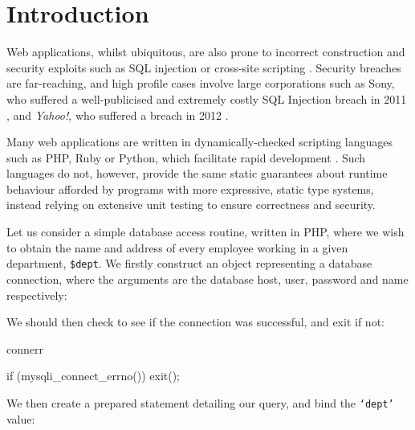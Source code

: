 \section{Introduction}

Web applications, whilst ubiquitous, are also prone to incorrect construction
and security exploits such as SQL injection \cite{owasp:sqli} or cross-site
scripting \cite{owasp:xss}. Security breaches are
far-reaching, and high profile cases involve large corporations such as Sony,
who suffered a well-publicised and extremely costly SQL Injection breach in
2011 \cite{ieee:sony}, and \textit{Yahoo!}, who suffered a breach in 2012
\cite{imperva:yahoo}. 

Many web applications are written in dynamically-checked scripting languages
such as PHP, Ruby or Python, which facilitate rapid development
\cite{w3techs:webpls}. Such languages do not, however, provide the same static 
guarantees about runtime behaviour afforded by
programs with more expressive, static type systems, instead relying on
extensive unit testing to ensure correctness and security. 

\noindent
Let us consider a simple database access routine, written in
PHP, where we wish to obtain the name and address of every employee working in
a given department, \texttt{\$dept}. We firstly construct an object
representing a database connection, where the arguments are the database host,
user, password and name respectively:


\noindent
We should then check to see if the connection was successful, and exit
if not:

\begin{SaveVerbatim}{connerr}

if (mysqli_connect_errno()) { exit(); }

\end{SaveVerbatim}

\noindent
We then create a prepared statement detailing our query, and bind the
\texttt{`dept'} value:

